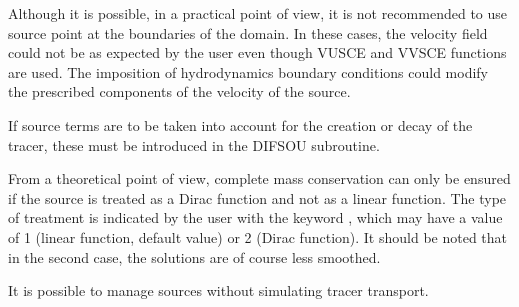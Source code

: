  Although it is possible, in a practical point of view, it is not recommended to use source point at the boundaries of the domain. In these cases, the velocity field could not be as expected by the user even though VUSCE and VVSCE functions are used. The imposition of hydrodynamics boundary conditions could modify the prescribed components of the velocity of the source.

 If source terms are to be taken into account for the creation or decay of the tracer, these must be introduced in the DIFSOU subroutine.

 From a theoretical point of view, complete mass conservation can only be ensured if the source is treated as a Dirac function and not as a linear function. The type of treatment is indicated by the user with the keyword , which may have a value of 1 (linear function, default value) or 2 (Dirac function). It should be noted that in the second case, the solutions are of course less smoothed.

 It is possible to manage sources without simulating tracer transport.



